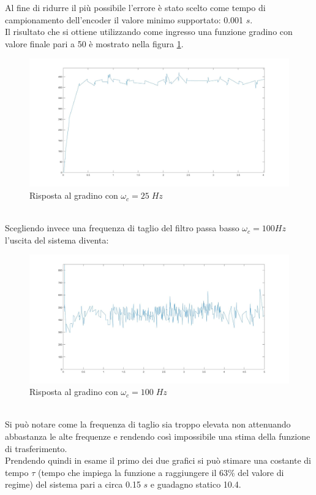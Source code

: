Al fine di ridurre il più possibile l'errore è stato scelto come tempo di campionamento dell'encoder il valore minimo supportato: 0.001 $s$.\\
Il risultato che si ottiene utilizzando come ingresso una funzione gradino con valore finale pari a 50 è mostrato nella figura \ref{motore50StepCamp1000}.
\begin{figure}[ht]
	\centering
	\includegraphics[width=\textwidth]{motore50StepCamp1000.jpg}
	\caption{Risposta al gradino con $\omega_c=25\;Hz$}
	\label{motore50StepCamp1000}
\end{figure}
\\Scegliendo invece una frequenza di taglio del filtro passa basso $\omega_c = 100Hz$ l'uscita del sistema diventa:
\begin{figure}[ht]
	\centering
	\includegraphics[width=\textwidth]{motore50StepCamp1000Polo100.jpg}
	\caption{Risposta al gradino con $\omega_c=100\;Hz$ }
	\label{motore50StepCamp1000Polo100}
\end{figure}
\\Si può notare come la frequenza di taglio sia troppo elevata non attenuando abbastanza le alte frequenze e rendendo così impossibile una stima della funzione di trasferimento.\\
Prendendo quindi in esame il primo dei due grafici si può stimare una costante di tempo $\tau$ (tempo che impiega la funzione a raggiungere il 63\% del valore di regime) del sistema pari a circa 0.15 $s$ e guadagno statico 10.4.\\\\

